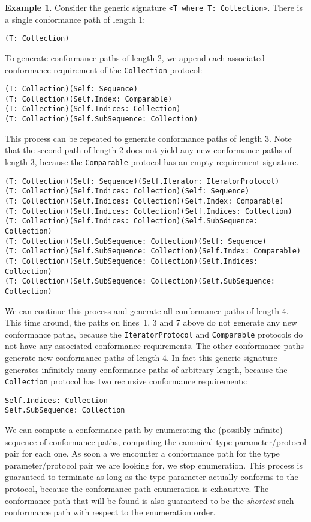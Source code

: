 \documentclass[a4paper,headsepline,bibliography=totoc,toc=flat,fleqn,twoside=semi]{scrbook}
\theoremstyle{definition}
\theoremstyle{definition}
\newtheorem{example}{Example}[chapter]
\theoremstyle{definition}
\begin{document}
\begin{example}\label{collectionconformancepaths}
Consider the generic signature \texttt{<T where T:\ Collection>}. There is a single conformance path of length 1:
\begin{Verbatim}
(T: Collection)
\end{Verbatim}
To generate conformance paths of length 2, we append each associated conformance requirement of the \texttt{Collection} protocol:
\begin{Verbatim}
(T: Collection)(Self: Sequence)
(T: Collection)(Self.Index: Comparable)
(T: Collection)(Self.Indices: Collection)
(T: Collection)(Self.SubSequence: Collection)
\end{Verbatim}
This process can be repeated to generate conformance paths of length 3. Note that the second path of length 2 does not yield any new conformance paths of length 3, because the \texttt{Comparable} protocol has an empty requirement signature.
\begin{Verbatim}
(T: Collection)(Self: Sequence)(Self.Iterator: IteratorProtocol)
(T: Collection)(Self.Indices: Collection)(Self: Sequence)
(T: Collection)(Self.Indices: Collection)(Self.Index: Comparable)
(T: Collection)(Self.Indices: Collection)(Self.Indices: Collection)
(T: Collection)(Self.Indices: Collection)(Self.SubSequence: Collection)
(T: Collection)(Self.SubSequence: Collection)(Self: Sequence)
(T: Collection)(Self.SubSequence: Collection)(Self.Index: Comparable)
(T: Collection)(Self.SubSequence: Collection)(Self.Indices: Collection)
(T: Collection)(Self.SubSequence: Collection)(Self.SubSequence: Collection)
\end{Verbatim}
We can continue this process and generate all conformance paths of length 4. This time around, the paths on lines~1, 3 and 7 above do not generate any new conformance paths, because the \texttt{IteratorProtocol} and \texttt{Comparable} protocols do not have any associated conformance requirements. The other conformance paths generate new conformance paths of length 4. In fact this generic signature generates infinitely many conformance paths of arbitrary length, because the \texttt{Collection} protocol has two recursive conformance requirements:
\begin{verbatim}
Self.Indices: Collection
Self.SubSequence: Collection
\end{verbatim}
\end{example}

We can compute a conformance path by enumerating the (possibly infinite) sequence of conformance paths, computing the canonical type parameter/protocol pair for each one. As soon a we encounter a conformance path for the type parameter/protocol pair we are looking for, we stop enumeration. This process is guaranteed to terminate as long as the type parameter actually conforms to the protocol, because the conformance path enumeration is exhaustive. The conformance path that will be found is also guaranteed to be the \emph{shortest} such conformance path with respect to the enumeration order.
\end{document}
